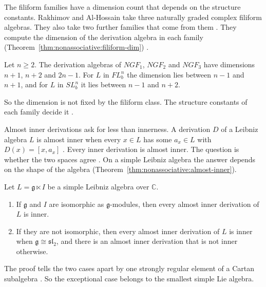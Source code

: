 The filiform families have a dimension count that depends on the structure
constants. Rakhimov and Al-Hossain take three naturally graded complex filiform
algebras. They also take two further families that come from them
\cite[Theorem~1, p.~3]{RakhimovAlHossain2012}. They compute the dimension of
the derivation algebra in each family (Theorem~\ref{thm:nonassociative:filiform-dim})
\cite[Theorems~3--5, pp.~4, 8 and~12]{RakhimovAlHossain2012}.\begin{theorem}\label{thm:nonassociative:filiform-dim}
Let $n\geq2$. The derivation algebras of $NGF_1$, $NGF_2$ and $NGF_3$ have
dimensions $n+1$, $n+2$ and $2n-1$. For $L$ in $FL_b^n$ the dimension lies
between $n-1$ and $n+1$, and for $L$ in $SL_b^n$ it lies between $n-1$ and
$n+2$.
\end{theorem}

So the dimension is not fixed by the filiform class. The structure constants
of each family decide it \cite[pp.~8--12]{RakhimovAlHossain2012}.

Almost inner derivations ask for less than innerness. A derivation $D$ of a
Leibniz algebra $L$ is almost inner when every $x\in L$ has some $a_x\in L$
with $D(x)=[x,a_x]$ \cite[Definition~2.4, p.~1527]{Kurbanbaev2025}. Every inner
derivation is almost inner. The question is whether the two spaces agree
\cite[p.~1527]{Kurbanbaev2025}. On a simple Leibniz algebra the answer depends
on the shape of the algebra (Theorem~\ref{thm:nonassociative:almost-inner}).

\begin{theorem}\label{thm:nonassociative:almost-inner}
Let $L=\mathfrak{g}\ltimes I$ be a simple Leibniz algebra over $\mathbb{C}$.
\begin{enumerate}
\item If $\mathfrak{g}$ and $I$ are isomorphic as $\mathfrak{g}$-modules, then
every almost inner derivation of $L$ is inner.
\item If they are not isomorphic, then every almost inner derivation of $L$ is
inner when $\mathfrak{g}\cong\mathfrak{sl}_2$, and there is an almost inner
derivation that is not inner otherwise.
\end{enumerate}
\end{theorem}

The proof tells the two cases apart by one strongly regular element of a
Cartan subalgebra \cite[p.~1530]{Kurbanbaev2025}. So the exceptional case
belongs to the smallest simple Lie algebra.

